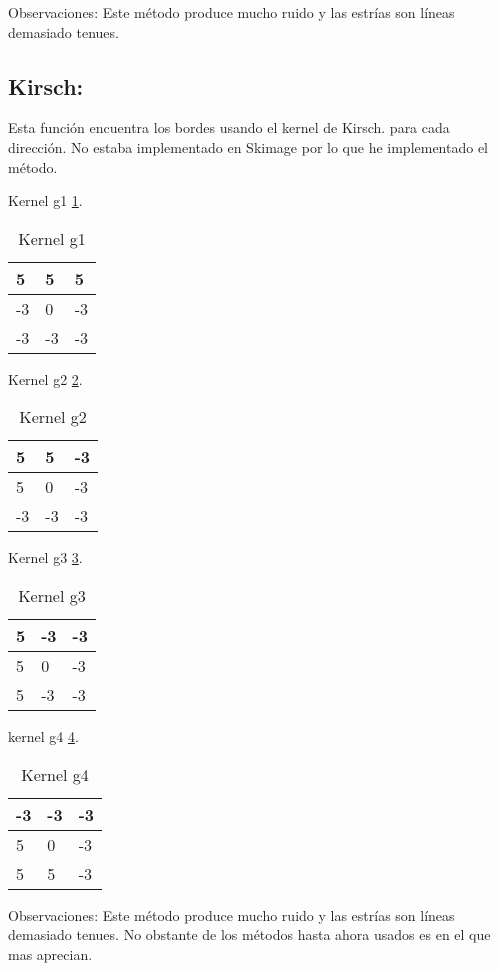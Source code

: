Observaciones:
Este método produce mucho ruido y las estrías son líneas demasiado tenues.

\subsection{Kirsch:}
Esta función encuentra los bordes usando el kernel de Kirsch.
para cada dirección.
No estaba implementado en Skimage por lo que he implementado el método.

Kernel g1 \ref{F_k6_1}.
\begin{table}[]
	\centering
	\caption{Kernel g1}
	\label{F_k6_1}
	\begin{tabular}{|l|l|l|}
		\hline
		5  & 5  & 5  \\ \hline
		-3 & 0  & -3 \\ \hline
		-3 & -3 & -3 \\ \hline
	\end{tabular}
\end{table}

Kernel g2 \ref{F_k6_2}.
\begin{table}[]
	\centering
	\caption{Kernel g2}
	\label{F_k6_2}
	\begin{tabular}{|l|l|l|}
		\hline
		5  & 5  & -3  \\ \hline
		5 & 0  & -3 \\ \hline
		-3 & -3 & -3 \\ \hline
	\end{tabular}
\end{table}


Kernel g3 \ref{F_k6_3}.

\begin{table}[]
	\centering
	\caption{Kernel g3}
	\label{F_k6_3}
	\begin{tabular}{|l|l|l|}
		\hline
		5  & -3 & -3  \\ \hline
		5 & 0  & -3 \\ \hline
		5 & -3 & -3 \\ \hline
	\end{tabular}
\end{table}

kernel g4 \ref{F_k6_4}.

\begin{table}[]
	\centering
	\caption{Kernel g4}
	\label{F_k6_4}
	\begin{tabular}{|l|l|l|}
		\hline
		-3  & -3 & -3  \\ \hline
		5 & 0  & -3 \\ \hline
		5 & 5 & -3 \\ \hline
	\end{tabular}
\end{table}
Observaciones:
Este método produce mucho ruido y las estrías son líneas demasiado tenues.
No obstante de los métodos hasta ahora usados es en el que mas aprecian.

